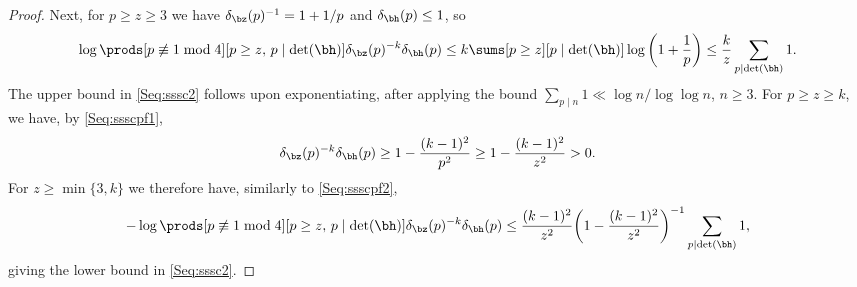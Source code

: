 \documentclass[12pt, reqno, twoside, letterpaper]{amsart}
\begin{document}
\begin{nixnix}
\begin{proof}
Next, for $p \ge z \ge 3$ we have $\delta_{\bz}(p)^{-1} = 1 + 1/p$ 
and $\delta_{\bh}(p) \le 1$, so 
\[
  \log \prods[p \not\equiv 1 \bmod 4][p \ge z, \, p \mid \det(\bh)] 
   \delta_{\bz}(p)^{-k}\delta_{\bh}(p) 
    \le 
     k
      \sums[p \ge z][p \mid \det(\bh)] \log\bigg(1 + \frac{1}{p}\bigg)
       \le
        \frac{k}{z}
         \sum_{p \mid \det(\bh)} 1. 
\]
%
The upper bound in \eqref{Seq:sssc2} follows upon exponentiating, 
after applying the bound 
$\sum_{p \mid n} 1 \ll \log n/\log\log n$, $n \ge 3$.
%
For $p \ge z \ge k$, we have, by \eqref{Seq:ssscpf1},  
\[
  \delta_{\bz}(p)^{-k}\delta_{\bh}(p) 
   \ge 1 - \frac{(k - 1)^2}{p^2}
    \ge 1 - \frac{(k - 1)^2}{z^2} 
    > 0.
\]
%
For $z \ge \min\{3,k\}$ we therefore have, similarly to 
\eqref{Seq:ssscpf2}, 
\[
 -\log \prods[p \not\equiv 1 \bmod 4][p \ge z, \, p \mid \det(\bh)]
   \delta_{\bz}(p)^{-k}\delta_{\bh}(p) 
    \le 
     \frac{(k - 1)^2}{z^2}
      \bigg(1 - \frac{(k - 1)^2}{z^2}\bigg)^{-1}
       \sum_{p \mid \det(\bh)} 1,
\]
giving the lower bound in \eqref{Seq:sssc2}.
\end{proof}
%
\end{nixnix}




\end{document}
